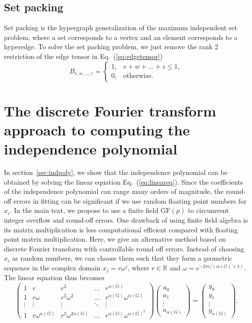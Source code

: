 \documentclass[onefignum, onetabnum]{siamart190516}
\newcommand{\<}{\langle}
\renewcommand{\>}{\rangle}
\newcommand{\Eq}[1]{Eq.~(\ref{#1})}
\begin{document}
\subsection{Set packing}
Set packing is the hypergraph generalization of the maximum independent set problem, where a set corresponds to a vertex and an element corresponds to a hyperedge.
To solve the set packing problem, we just remove the rank 2 restriction of the edge tensor in \Eq{eq:edgetensor}
\begin{equation}
    B_{v,w,\ldots, z} = \begin{cases}
        1, & v+w+\ldots+z\leq 1,\\
        0, & \text{otherwise}.
    \end{cases}
\end{equation}

\section{The discrete Fourier transform approach to computing the independence polynomial}\label{app:fft}

In section~\ref{sec:indpoly}, we show that the independence polynomial can be obtained by solving the linear equation \Eq{eq:lineareq}.
Since the coefficients of the independence polynomial can range many orders of magnitude, the round-off errors in fitting can be significant if we use random floating point numbers for $x_{i}$.
In the main text, we propose to use a finite field $\text{GF}(p)$ to circumvent integer overflow and round-off errors.
One drawback of using finite field algebra is its matrix multiplication is less computational efficient compared with floating point matrix multiplication.
Here, we give an alternative method based on discrete Fourier transform with controllable round off errors.
Instead of choosing $x_{i}$ as random numbers, we can choose them such that they form a geometric sequence in the complex domain $x_j = r\omega^j$, where $r \in \mathbb{R}$ and $\omega = e^{-2\pi i/( \alpha(G)+1)}$. The linear equation thus becomes
\begin{equation}
\left(\begin{matrix}
1 & r & r^2 & \ldots & r^{\alpha(G)} \\
1 & r\omega & r^2\omega^2 & \ldots & r^{\alpha(G)} \omega^{\alpha(G)} \\
\vdots & \vdots & \vdots &\ddots & \vdots \\
1 & r\omega^{\alpha(G)} & r^2\omega^{2{\alpha(G)}} & \ldots & r^{\alpha(G)}\omega^{{\alpha(G)}^2}
\end{matrix}\right)
\left(\begin{matrix}
a_0 \\ a_1 \\ \vdots \\ a_{\alpha(G)}
\end{matrix}\right)
= \left(\begin{matrix}
y_0 \\ y_1 \\ \vdots \\ y_{\alpha(G)}
\end{matrix}\right).
\end{equation}
\end{document}
